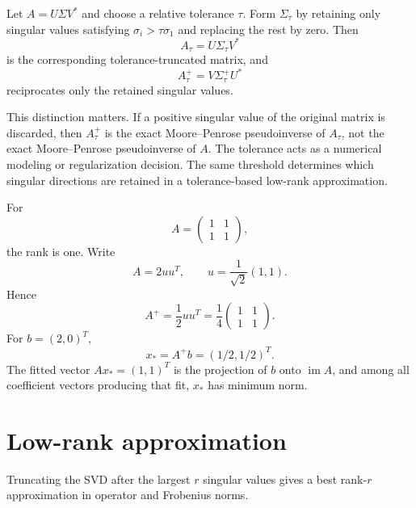 \begin{remark}
Let \(A=U\Sigma V^*\) and choose a relative tolerance \(\tau\).  Form
\(\Sigma_\tau\) by retaining only singular values satisfying
\(\sigma_i>\tau\sigma_1\) and replacing the rest by zero.  Then
\[
A_\tau=U\Sigma_\tau V^*
\]
is the corresponding tolerance-truncated matrix, and
\[
A_\tau^+
=
V\Sigma_\tau^+U^*
\]
reciprocates only the retained singular values.

This distinction matters.  If a positive singular value of the original
matrix is discarded, then \(A_\tau^+\) is the exact Moore--Penrose
pseudoinverse of \(A_\tau\), not the exact Moore--Penrose pseudoinverse of
\(A\).  The tolerance acts as a numerical modeling or regularization decision.
The same threshold determines which singular directions are retained in a
tolerance-based low-rank approximation.
\end{remark}


\begin{example}\label{ex:i18-expand-02}
For
\[
A=\begin{pmatrix}1&1\\1&1\end{pmatrix},
\]
the rank is one. Write
\[
A=2uu^T,\qquad u=\frac1{\sqrt2}(1,1).
\]
Hence
\[
A^+=\frac12uu^T
=\frac14\begin{pmatrix}1&1\\1&1\end{pmatrix}.
\]
For \(b=(2,0)^T\),
\[
x_*=A^+b=(1/2,1/2)^T.
\]
The fitted vector \(Ax_*=(1,1)^T\) is the projection of \(b\) onto
\(\operatorname{im}A\), and among all coefficient vectors producing that fit,
\(x_*\) has minimum norm.
\end{example}
\section{Low-rank approximation}
Truncating the SVD after the largest $r$ singular values gives a best rank-$r$ approximation in operator and Frobenius norms.

